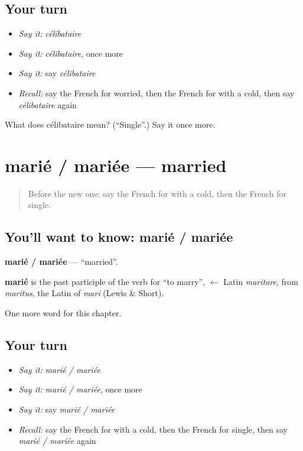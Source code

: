 \subsection*{Your turn}
\begin{itemize}
\raggedright
  \item \emph{Say it:} \emph{célibataire}
  \item \emph{Say it:} \emph{célibataire}, once more
  \item \emph{Say it:} say \emph{célibataire}
  \item \emph{Recall:} say the French for worried, then the French for with a cold, then say \emph{célibataire} again
\end{itemize}

\begin{tcolorbox}[breakable,colback=teal!4,colframe=teal!35!black,title={Before you move on}]
What does célibataire mean? (\textquotedblleft{}Single\textquotedblright{}.) Say it once more.
\end{tcolorbox}
\section[marié / mariée]{marié / mariée — married}

\label{lesson:FR-C162-marie-mariee}



\begin{quote}
Before the new one: say the French for with a cold, then the French for single.
\end{quote}

\subsection*{You'll want to know: marié / mariée}
\textbf{marié / mariée} — \textquotedblleft{}married\textquotedblright{}.

\begin{cousinweb}
\textbf{marié} is the past participle of the verb for \textquotedblleft{}to marry\textquotedblright{}, $\leftarrow$ Latin \emph{maritare}, from \emph{maritus}, the Latin of \emph{mari} (Lewis \& Short).
\end{cousinweb}

\begin{grammarlens}[title={What you've built}]
One more word for this chapter.
\end{grammarlens}

\subsection*{Your turn}
\begin{itemize}
\raggedright
  \item \emph{Say it:} \emph{marié / mariée}
  \item \emph{Say it:} \emph{marié / mariée}, once more
  \item \emph{Say it:} say \emph{marié / mariée}
  \item \emph{Recall:} say the French for with a cold, then the French for single, then say \emph{marié / mariée} again
\end{itemize}

